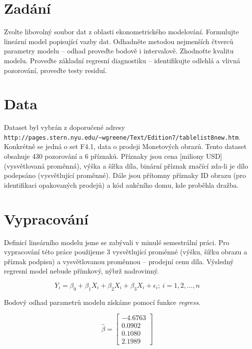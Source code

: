 \section{Zadání}

Zvolte libovolný soubor dat z oblasti ekonometrického modelování.
Formulujte lineární model popisující vazby dat.
Odhadněte metodou nejmenších čtverců parametry modelu – odhad proveďte bodově i intervalově.
Zhodnoťte kvalitu modelu.
Proveďte základní regresní diagnostiku – identifikujte odlehlá a vlivná pozorování, proveďte testy residuí.

\section{Data}

Dataset byl vybrán z doporučené adresy \nolinkurl{http://pages.stern.nyu.edu/~wgreene/Text/Edition7/tablelist8new.htm}.
Konkrétně se jedná o set F4.1, data o prodeji Monetových obrazů.
Tento dataset obsahuje 430 pozorování a 6 příznaků.
Příznaky jsou cena [miliony USD] (vysvětlovaná proměnná), výška a šířka díla, binární příznak značící zda-li je dílo podepsáno (vysvětlující proměnné).
Dále jsou přítomny příznaky ID obrazu (pro identifikaci opakovaných prodejů) a kód aukčního domu, kde proběhla dražba.

\section{Vypracování}

Definicí lineárního modelu jsme se zabývali v minulé semestrální práci.
Pro vypracování této práce použijeme 3 vysvětlující proměnné (výšku, šířku obrazu a příznak podpisu) a vysvětlovanou proměnnou – prodejní cenu díla.
Výsledný regresní model nebude přímkový, nýbrž nadrovinný.

\begin{equation}
    Y_i = \beta_0 + \beta_1 X_i + \beta_2 X_i + \beta_3 X_i + \epsilon_i; \: i = 1,2,\ldots,n
\end{equation}

Bodový odhad parametrů modelu získáme pomocí funkce \textit{regress}.

\begin{equation}
    \hat{\beta} = \left[\begin{matrix} -4.6763 \\ 0.0902 \\ 0.1080 \\ 2.1989 \end{matrix}\right]
\end{equation}

